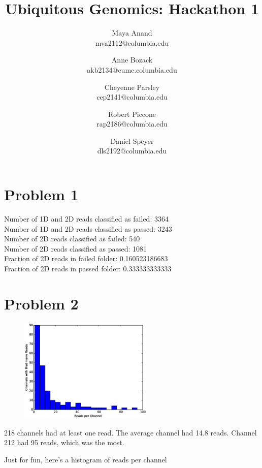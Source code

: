 \documentclass[11pt]{article}
\title{Ubiquitous Genomics: Hackathon 1}
\author{
  Maya Anand\\ mva2112@columbia.edu \and
  Anne Bozack\\ akb2134@cumc.columbia.edu \and
  Cheyenne Parsley\\ cep2141@columbia.edu \and
  Robert Piccone\\ rap2186@columbia.edu \and
  Daniel Speyer\\ dls2192@columbia.edu}
\begin{document}
\maketitle
\section*{Problem 1}
Number of 1D and 2D reads classified as failed: 3364\\
Number of 1D and 2D reads classified as passed: 3243\\
Number of 2D reads classified as failed: 540\\
Number of 2D reads classified as passed: 1081\\
Fraction of 2D reads in failed folder: 0.160523186683\\
Fraction of 2D reads in passed folder: 0.333333333333\\
\section*{Problem 2}
\begin{figure}
  \includegraphics[width=2.5in]{part2hist}
\end{figure}
218 channels had at least one read. 
The average channel had 14.8 reads. 
Channel 212 had 95 reads, which was the most.

Just for fun, here's a histogram of reads per channel\\
\end{document}
